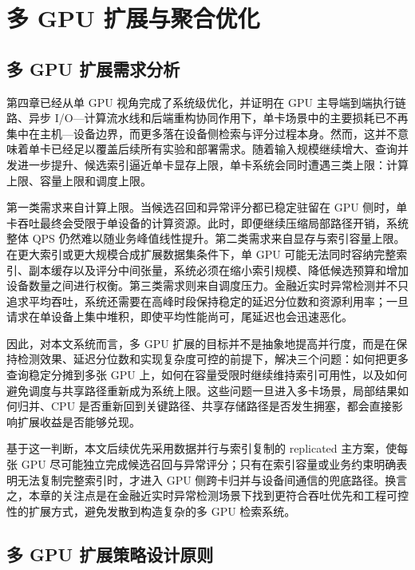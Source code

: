 
\chapter{多 GPU 扩展与聚合优化}

\section{多 GPU 扩展需求分析}

第四章已经从单 GPU 视角完成了系统级优化，并证明在 GPU 主导端到端执行链路、异步 I/O---计算流水线和后端重构协同作用下，单卡场景中的主要损耗已不再集中在主机---设备边界，而更多落在设备侧检索与评分过程本身。然而，这并不意味着单卡已经足以覆盖后续所有实验和部署需求。随着输入规模继续增大、查询并发进一步提升、候选索引逼近单卡显存上限，单卡系统会同时遭遇三类上限：计算上限、容量上限和调度上限。

第一类需求来自计算上限。当候选召回和异常评分都已稳定驻留在 GPU 侧时，单卡吞吐最终会受限于单设备的计算资源。此时，即便继续压缩局部路径开销，系统整体 QPS 仍然难以随业务峰值线性提升。第二类需求来自显存与索引容量上限。在更大索引或更大规模合成扩展数据集条件下，单 GPU 可能无法同时容纳完整索引、副本缓存以及评分中间张量，系统必须在缩小索引规模、降低候选预算和增加设备数量之间进行权衡\citep{cuvs_multi_gpu_nn,cuvs_multi_gpu_ivf_host}。第三类需求则来自调度压力。金融近实时异常检测并不只追求平均吞吐，系统还需要在高峰时段保持稳定的延迟分位数和资源利用率；一旦请求在单设备上集中堆积，即使平均性能尚可，尾延迟也会迅速恶化。

因此，对本文系统而言，多 GPU 扩展的目标并不是抽象地提高并行度，而是在保持检测效果、延迟分位数和实现复杂度可控的前提下，解决三个问题：如何把更多查询稳定分摊到多张 GPU 上，如何在容量受限时继续维持索引可用性，以及如何避免调度与共享路径重新成为系统上限\citep{cuvs_multi_gpu_nn}。这些问题一旦进入多卡场景，局部结果如何归并、CPU 是否重新回到关键路径、共享存储路径是否发生拥塞，都会直接影响扩展收益是否能够兑现。

基于这一判断，本文后续优先采用数据并行与索引复制的 replicated 主方案，使每张 GPU 尽可能独立完成候选召回与异常评分；只有在索引容量或业务约束明确表明无法复制完整索引时，才进入 GPU 侧跨卡归并与设备间通信的兜底路径。换言之，本章的关注点是在金融近实时异常检测场景下找到更符合吞吐优先和工程可控性的扩展方式，避免发散到构造复杂的多 GPU 检索系统。

\section{多 GPU 扩展策略设计原则}

